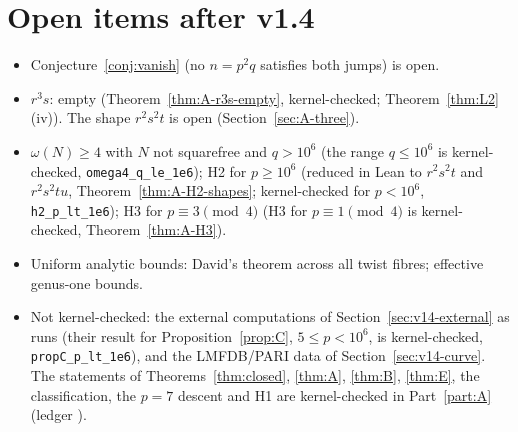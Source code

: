 \documentclass[11pt,reqno]{amsart}
\theoremstyle{definition}
\begin{document}
\section{Open items after v1.4}
\label{sec:v14-open}
\begin{itemize}
\item Conjecture~\ref{conj:vanish} (no \(n=p^2q\) satisfies both jumps) is open.
\item \(r^3s\): empty (Theorem~\ref{thm:A-r3s-empty}, kernel-checked; Theorem~\ref{thm:L2}(iv)). The shape \(r^2s^2t\) is open (Section~\ref{sec:A-three}).
\item \(\omega(N)\ge 4\) with \(N\) not squarefree and \(q>10^6\) (the range \(q\le 10^6\) is kernel-checked, \texttt{omega4\_q\_le\_1e6}); H2 for \(p\ge 10^6\) (reduced in Lean to \(r^2s^2t\) and \(r^2s^2tu\), Theorem~\ref{thm:A-H2-shapes}; kernel-checked for \(p<10^6\), \texttt{h2\_p\_lt\_1e6}); H3 for \(p\equiv 3\pmod 4\) (H3 for \(p\equiv 1\pmod 4\) is kernel-checked, Theorem~\ref{thm:A-H3}).
\item Uniform analytic bounds: David's theorem across all twist fibres; effective genus-one bounds.
\item Not kernel-checked: the external computations of Section~\ref{sec:v14-external} as runs (their result for Proposition~\ref{prop:C}, \(5\le p<10^6\), is kernel-checked, \texttt{propC\_p\_lt\_1e6}), and the LMFDB/PARI data of Section~\ref{sec:v14-curve}. The statements of Theorems~\ref{thm:closed}, \ref{thm:A}, \ref{thm:B}, \ref{thm:E}, the classification, the \(p=7\) descent and H1 are kernel-checked in Part~\ref{part:A} (ledger ).
\end{itemize}
\end{document}
